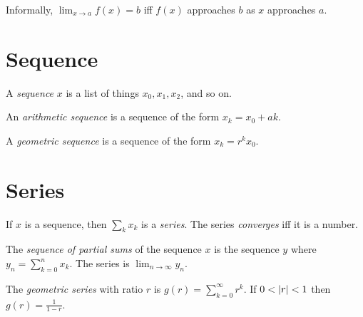 Informally, \(\lim_{x \to a} f(x) = b\)
iff \(f(x)\) approaches \(b\) as \(x\) approaches \(a\).

\section{Sequence}

%
A \emph{sequence} \(x\) is a list of things \(x_0, x_1, x_2\), and so on.

An
%
%
\emph{arithmetic sequence} is a sequence of the form \(x_k = x_0 + a k\).

A
%
%
\emph{geometric sequence} is a sequence of the form \(x_k = r^k x_0\).

\section{Series}

%
If \(x\) is a sequence, then \(\sum_k x_k\) is a \emph{series}.
The series \emph{converges} iff it is a number.

The
%
%
\emph{sequence of partial sums} of the sequence \(x\) is
the sequence \(y\)
where \(y_n = \sum_{k=0}^n x_k\).
The series is \(\lim_{n \to \infty} y_n\).

The
%
%
\emph{geometric series} with ratio \(r\) is \(g(r) = \sum_{k=0}^\infty r^k\).
If \(0 < |r| < 1\) then \(g(r) = \frac{1}{1-r}\).
